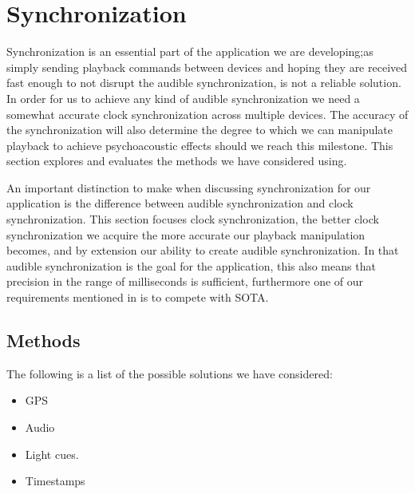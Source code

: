\section{Synchronization}
Synchronization is an essential part of the application we are developing;as simply sending playback commands between devices and hoping they are received fast enough to not disrupt the audible synchronization, is not a reliable solution.
In order for us to achieve any kind of audible synchronization we need a somewhat accurate clock synchronization across multiple devices.
The accuracy of the synchronization will also determine the degree to which we can manipulate playback to achieve psychoacoustic effects should we reach this milestone.
This section explores and evaluates the methods we have considered using.

An important distinction to make when discussing synchronization for our application is the difference between audible synchronization and clock synchronization.
This section focuses clock synchronization, the better clock synchronization we acquire the more accurate our playback manipulation becomes, and by extension our ability to create audible synchronization.
In that audible synchronization is the goal for the application, this also means that precision in the range of milliseconds is sufficient, furthermore one of our requirements mentioned in  is to compete with \ac{SOTA}.

\subsection{Methods}
The following is a list of the possible solutions we have considered:
\begin{itemize}
    \item GPS
    \item Audio
    \item Light cues.
    \item Timestamps
\end{itemize}

